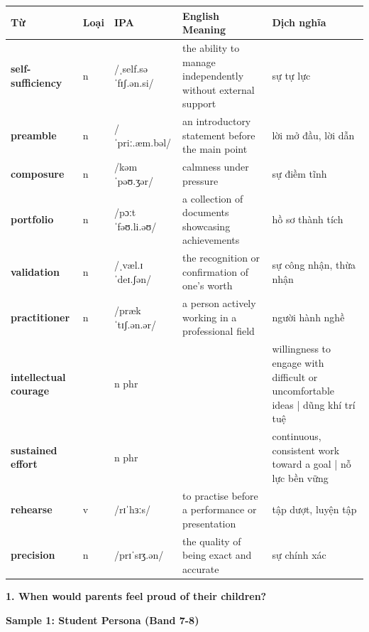 \vspace{0.8em}
\begin{center}
\renewcommand{\arraystretch}{1.65}
\begin{tabularx}{\textwidth}{|V{0.22\textwidth}|C{0.07\textwidth}|I{0.20\textwidth}|Y|V{0.18\textwidth}|}
\hline
{}
\textbf{Từ} & \textbf{Loại} & \textbf{IPA} & \textbf{English Meaning} & \textbf{Dịch nghĩa} \\
\hline
\textbf{self-sufficiency} & n & /ˌself.səˈfɪʃ.ən.si/ & the ability to manage independently without external support & sự tự lực \\ \hline
\textbf{preamble} & n & /ˈpriː.æm.bəl/ & an introductory statement before the main point & lời mở đầu, lời dẫn \\ \hline
\textbf{composure} & n & /kəmˈpəʊ.ʒər/ & calmness under pressure & sự điềm tĩnh \\ \hline
\textbf{portfolio} & n & /pɔːtˈfəʊ.li.əʊ/ & a collection of documents showcasing achievements & hồ sơ thành tích \\ \hline
\textbf{validation} & n & /ˌvæl.ɪˈdeɪ.ʃən/ & the recognition or confirmation of one's worth & sự công nhận, thừa nhận \\ \hline
\textbf{practitioner} & n & /prækˈtɪʃ.ən.ər/ & a person actively working in a professional field & người hành nghề \\ \hline
\textbf{intellectual courage} & & n phr & & willingness to engage with difficult or uncomfortable ideas | dũng khí trí tuệ \\ \hline
\textbf{sustained effort} & & n phr & & continuous, consistent work toward a goal | nỗ lực bền vững \\ \hline
\textbf{rehearse} & v & /rɪˈhɜːs/ & to practise before a performance or presentation & tập dượt, luyện tập \\ \hline
\textbf{precision} & n & /prɪˈsɪʒ.ən/ & the quality of being exact and accurate & sự chính xác \\ \hline
\end{tabularx}
\end{center}

\partthreeheader

\begin{ieltsquestion}
\textbf{1. When would parents feel proud of their children?}
\end{ieltsquestion}
\textbf{Sample 1: Student Persona (Band 7-8)}

